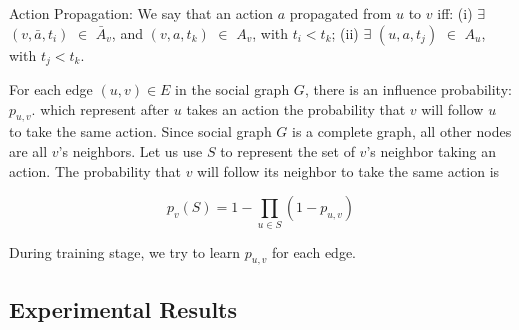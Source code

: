 \begin{definition}{Action Propagation:}
We say that an action $a$ propagated from $u$ to $v$ iff: (i) $\exists$ $(v, \bar{a}, t_i)$ $\in$ $\bar{A}_v$, 
and $(v, a, t_k)$ $\in$ $A_v$, with $t_i < t_k$; (ii) $\exists$ $(u, a, t_j)$ $\in$ $A_u$, with $t_j < t_k$. 
\end{definition}

For each edge $(u, v) \in E$ in the social graph $G$, 
there is an influence probability: $p_{u,v}$. 
which represent after $u$ takes an action the probability that $v$ will follow $u$ to take the same action. 
Since social graph $G$ is a complete graph, 
all other nodes are all $v$’s neighbors. Let us use $S$ to represent the set of $v$’s neighbor taking an action. 
The probability that $v$ will follow its neighbor to take the same action is

$$p_v(S) = 1 - \prod\limits_{u \in S}(1 - p_{u,v})$$

During training stage, we try to learn $p_{u,v}$ for each edge. 



\subsection{Experimental Results}